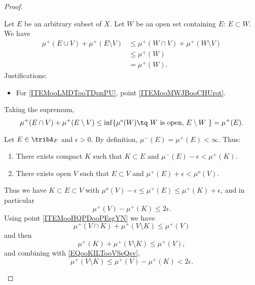 \begin{proof}
\begin{subproof}
		Let \( E\) be an arbitrary subset of \( X\). Let \( W\) be an open set containing \( E\): \( E\subset W\). We have
		\begin{subequations}
			\begin{align}
				\mu^+(E\cup V)+\mu^+(E\setminus V) & \leq \mu^+(W\cap V)+\mu^+(W\setminus V)    \\
				                                   & \leq \mu^+(W)   \label{ITEMooLMDTooTDpnPU} \\
				                                   & =\mu^+(W).
			\end{align}
		\end{subequations}
		Justifications:
		\begin{itemize}
			\item For \eqref{ITEMooLMDTooTDpnPU}, point \ref{ITEMooMWJBooCHUrot}.
		\end{itemize}
		Taking the supremum,
		\begin{equation}
			\mu^+(E\cap V)+\mu^+(E\setminus V)\leq\inf\{ \mu^o(W)\tq \text{ \( W\) is open, \( E\setminus W\) } \}=\mu^+(E).
		\end{equation}

		        \label{ITEMooTWGLooHVvkUW}

		Let \( E\in\tribA_F\) and \( \epsilon>0\). By definition, \( \mu^-(E)=\mu^+(E)<\infty\). Thus:
		\begin{enumerate}
			\item
			      There exists compact \( K\) such that \( K\subset E\) and \( \mu^-(E)-\epsilon<\mu^+(K)\).
			\item
			      There exists open \( V\) such that \( E\subset V\) and \( \mu^+(E)+\epsilon<\mu^o(V)\).
		\end{enumerate}
		Thus we have \( K\subset E\subset V\) with $\mu^o(V)-\epsilon\leq \mu^+(E)\leq \mu^+(K)+\epsilon$, and in particular
		\begin{equation}        \label{EQooKILTooVSeQsv}
			\mu^+(V)-\mu^+(K)\leq 2\epsilon.
		\end{equation}
		Using point \ref{ITEMooHQPDooPEsgYN} we have
		\begin{equation}
			\mu^+(V\cap K)+\mu^+(V\setminus K)\leq \mu^+(V)
		\end{equation}
		and then
		\begin{equation}
			\mu^+(K)+\mu^+(V\setminus K)\leq \mu^+(V),
		\end{equation}
		and combining with \eqref{EQooKILTooVSeQsv},
		\begin{equation}
			\mu^+(V\setminus K)\leq \mu^+(V)-\mu^+(K)<2\epsilon.
		\end{equation}


\end{subproof}
\end{proof}
